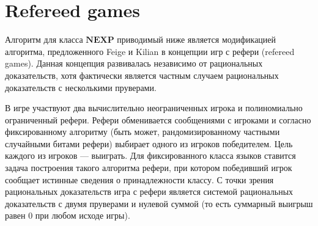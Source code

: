 \documentclass[14pt, a4paper, russian]{report}
\begin{document}
        \section{Refereed games}
        Алгоритм для класса $\textbf{NEXP}$ приводимый ниже является модификацией алгоритма, предложенного Feige и Kilian \cite{feige1997refereed} в концепции игр с рефери (refereed games). Данная концепция развивалась независимо от рациональных доказательств, хотя фактически является частным случаем рациональных доказательств с несколькими пруверами.

        В игре участвуют два вычислительно неограниченных игрока и полиномиально ограниченный рефери. Рефери обменивается сообщениями с игроками и согласно фиксированному алгоритму (быть может, рандомизированному частными случайными битами рефери) выбирает одного из игроков победителем. Цель каждого из игроков --- выиграть. Для фиксированного класса языков ставится задача построения такого алгоритма рефери, при котором победивший игрок сообщает истинные сведения о принадлежности классу. С точки зрения рациональных доказательств игра с рефери является системой рациональных доказательств с двумя пруверами и нулевой суммой (то есть суммарный выигрыш равен $0$ при любом исходе игры).
\end{document}
